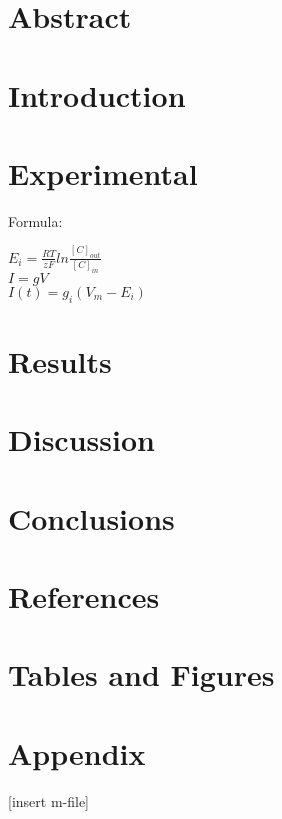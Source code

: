 \documentclass[12pt]{article}
\begin{document}

\section*{Abstract}
\section*{Introduction}
\section*{Experimental}
Formula:
\begin{center}
    $E_i=\frac{RT}{zF}ln\frac{[C]_{out}}{[C]_{in}}$\\
    $I=gV$\\
    $I(t)=g_i(V_m-E_i)$
\end{center}
\section*{Results}
\section*{Discussion}
\section*{Conclusions}
\section*{References}
\section*{Tables and Figures}
\section*{Appendix}
[insert m-file]
\end{document}
